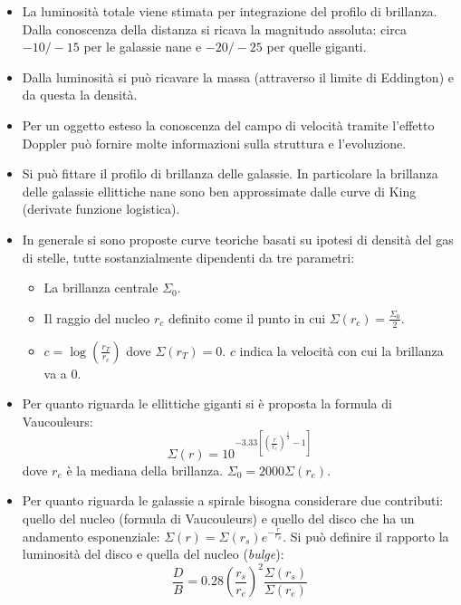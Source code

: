 \documentclass[11pt,a4paper]{article}
\begin{document}
\begin{itemize}
\item La luminosità totale viene stimata per integrazione del profilo di brillanza. Dalla conoscenza della distanza si ricava la magnitudo assoluta: circa $-10/-15$ per le galassie nane e $-20/-25$ per quelle giganti.

\item Dalla luminosità si può ricavare la massa (attraverso il limite di Eddington) e da questa la densità.

\item Per un oggetto esteso la conoscenza del campo di velocità tramite l'effetto Doppler può fornire molte informazioni sulla struttura e l'evoluzione.

\item Si può fittare il profilo di brillanza delle galassie. In particolare la brillanza delle galassie ellittiche nane sono ben approssimate dalle curve di King (derivate funzione logistica).

\item In generale si sono proposte curve teoriche basati su ipotesi di densità del gas di stelle, tutte sostanzialmente dipendenti da tre parametri:
\begin{itemize}
\item La brillanza centrale $\Sigma_0$.
\item Il raggio del nucleo $r_c$ definito come il punto in cui $\Sigma(r_c) = \frac{\Sigma_0}{2}$. 
\item $c = \log \left( \frac{r_T}{r_c} \right)$ dove $\Sigma (r_T) = 0$. $c$ indica la velocità con cui la brillanza va a $0$.
\end{itemize}

\item Per quanto riguarda le ellittiche giganti si è proposta la formula di Vaucouleurs: 
\begin{equation}
\Sigma (r) = 10^{-3.33 \left[ \left( \frac{r}{r_e} \right) ^{\frac{1}{4}} - 1 \right]}
\end{equation}
dove $r_e$ è la mediana della brillanza. $\Sigma_0 = 2000 \Sigma(r_e)$.

\item Per quanto riguarda le galassie a spirale bisogna considerare due contributi: quello del nucleo (formula di Vaucouleurs) e quello del disco che ha un andamento esponenziale: $\Sigma(r) = \Sigma(r_s) e^{-\frac{r}{r_S}}$. Si può definire il rapporto la luminosità del disco e quella del nucleo (\textit{bulge}): 
\begin{equation}
\frac{D}{B} = 0.28 \left( \frac{r_s}{r_e} \right)^{2} \frac{\Sigma (r_s)}{\Sigma (r_e)}
\end{equation}


\end{itemize}
\end{document}
